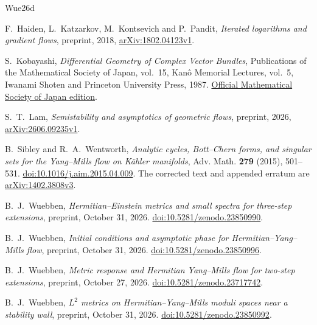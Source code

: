 \documentclass[11pt]{amsart}
\theoremstyle{definition}
\theoremstyle{remark}
\begin{document}
\FloatBarrier
\begin{thebibliography}{Wue26d}

F.~Haiden, L.~Katzarkov, M.~Kontsevich and P.~Pandit,
\emph{Iterated logarithms and gradient flows}, preprint, 2018,
\href{https://arxiv.org/abs/1802.04123v1}{arXiv:1802.04123v1}.

S.~Kobayashi, \emph{Differential Geometry of Complex Vector Bundles},
Publications of the Mathematical Society of Japan, vol.~15,
Kan\^o Memorial Lectures, vol.~5, Iwanami Shoten and Princeton
University Press, 1987.
\href{https://www.mathsoc.jp/assets/pdf/publications/pubmsj/Vol15.pdf}
{Official Mathematical Society of Japan edition}.

S.~T.~Lam, \emph{Semistability and asymptotics of geometric flows},
preprint, 2026,
\href{https://arxiv.org/abs/2606.09235v1}{arXiv:2606.09235v1}.

B.~Sibley and R.~A.~Wentworth,
\emph{Analytic cycles, Bott--Chern forms, and singular sets for
the Yang--Mills flow on K\"ahler manifolds},
Adv. Math. \textbf{279} (2015), 501--531.
\href{https://doi.org/10.1016/j.aim.2015.04.009}
{doi:10.1016/j.aim.2015.04.009}.
The corrected text and appended erratum are
\href{https://arxiv.org/abs/1402.3808v3}{arXiv:1402.3808v3}.

B.~J.~Wuebben, \emph{Hermitian--Einstein metrics and small spectra
for three-step extensions}, preprint, October 31, 2026.
\href{https://doi.org/10.5281/zenodo.23850990}{doi:10.5281/zenodo.23850990}.

B.~J.~Wuebben, \emph{Initial conditions and asymptotic phase
for Hermitian--Yang--Mills flow}, preprint, October 31, 2026.
\href{https://doi.org/10.5281/zenodo.23850996}{doi:10.5281/zenodo.23850996}.

B.~J.~Wuebben, \emph{Metric response and Hermitian Yang--Mills
flow for two-step extensions}, preprint, October 27, 2026.
\href{https://doi.org/10.5281/zenodo.23717742}
{doi:10.5281/zenodo.23717742}.

B.~J.~Wuebben, \emph{$L^2$ metrics on Hermitian--Yang--Mills moduli spaces near a stability wall},
preprint, October 31, 2026.
\href{https://doi.org/10.5281/zenodo.23850992}{doi:10.5281/zenodo.23850992}.

\end{thebibliography}
\end{document}
